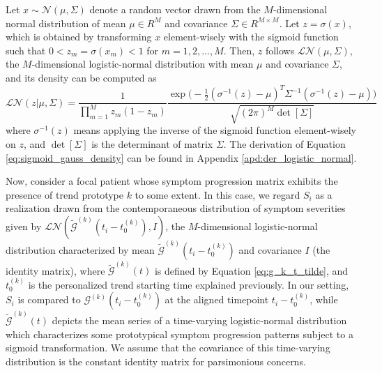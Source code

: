 \documentclass[mnsc]{informs3b} %
\begin{document}
Let $x \sim \mathcal{N}(\mu, \Sigma)$ denote a random vector drawn from the $M$-dimensional normal distribution of mean $\mu \in R^{M}$ and covariance $\Sigma \in R^{M \times M}$.
Let $z=\sigma(x)$, which is obtained by transforming $x$ element-wisely with the sigmoid function such that $0 < z_m=\sigma(x_m) < 1$ for $m=1,2,\dots,M$. Then, $z$ follows $\mathcal{L}\mathcal{N}(\mu, \Sigma)$, the $M$-dimensional logistic-normal distribution with mean $\mu$ and covariance $\Sigma$, and its density can be computed as
\begin{equation}
\label{eq:sigmoid_gauss_density}
\mathcal{L}\mathcal{N}(z|\mu, \Sigma) =
\frac{1}{\prod_{m=1}^{M} z_{m}(1-z_{m})}
\frac{\exp \big( -\frac{1}{2} ( \sigma^{-1}(z) - \mu )^{T}{\Sigma }^{-1} (\sigma^{-1}(z) - \mu) \big) }{\sqrt{(2\pi)^{M} \det [ \Sigma] }}
\end{equation}
where $\sigma^{-1}(z)$ means applying the inverse of the sigmoid function element-wisely on $z$, and $\det[\Sigma]$ is the determinant of matrix $\Sigma$. The derivation of Equation \ref{eq:sigmoid_gauss_density} can be found in Appendix \ref{apd:der_logistic_normal}.


Now, consider a focal patient whose symptom progression matrix exhibits the presence of trend prototype $k$ to some extent. 
In this case, we regard $S_i$ as a realization drawn from the contemporaneous distribution of symptom severities given by $\mathcal{L}\mathcal{N}({\tilde{\mathcal{G}}}^{(k)}(t_i-t_0^{(k)}), I)$, the $M$-dimensional logistic-normal distribution characterized by mean ${\tilde{\mathcal{G}}}^{(k)}(t_i-t_0^{(k)})$ and covariance $I$ (the identity matrix), where ${\tilde{\mathcal{G}}}^{(k)}(t)$ is defined by Equation \ref{eq:g_k_t_tilde}, and $t_0^{(k)}$ is the personalized trend starting time explained previously. 
In our setting, $S_i$ is compared to $\mathcal{G}^{(k)}(t_i-t_0^{(k)})$ at the aligned timepoint $t_i-t_0^{(k)}$, while ${\tilde{\mathcal{G}}}^{(k)}(t)$ depicts the mean series of a time-varying logistic-normal distribution which characterizes some prototypical symptom progression patterns subject to a sigmoid transformation. 
We assume that the covariance of this time-varying distribution is the constant identity matrix for parsimonious concerns. 
\end{document}
